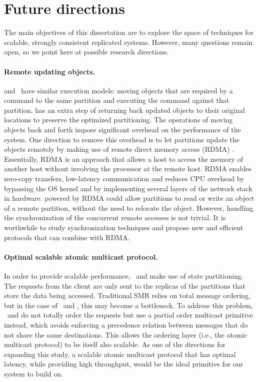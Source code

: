 \section{Future directions}

The main objectives of this dissertation are to explore the space of techniques
for scalable, strongly consistent replicated systems. However, many questions
remain open, so we point here at possible research directions.

\paragraph{Remote updating objects.} \dynastar and \dssmr\ have similar execution
models: moving objects that are required by a command to the same partition and
executing the command against that partition. \dynastar has an extra step of
returning back updated objects to their original locations to preserve the
optimized partitioning. The operations of moving objects back and forth impose
significant overhead on the performance of the system. 
One direction to remove this overhead is to let partitions update the objects
remotely by making use of remote direct memory access (RDMA)
\cite{recio2007remote,dragojevic2014farm}. Essentially, RDMA is an approach
that allows a host to access the memory of another host without involving the
processor at the remote host. RDMA enables zero-copy transfers, low-latency
communication and reduces CPU overhead by bypassing the OS kernel and by
implementing several layers of the network stack in hardware. \dynastar powered
by RDMA could allow partitions to read or write an object
of a remote partition, without the need to relocate the object. However, 
handling the synchronization of the concurrent remote accesses is not trivial.
It is worthwhile to study synchronization techniques and propose new
and efficient protocols that can combine \dynastar with RDMA.

\paragraph{Optimal scalable atomic multicast protocol.} 
In order to provide scalable performance, \dssmr\ and \dynastar make use of
state partitioning. The requests from the client are only sent to the replicas
of the partitions that store the data being accessed. Traditional SMR relies on
total message ordering, but in the case of \dssmr\ and \dynastar, this may
become a bottleneck. To address this problem, \dssmr\ and \dynastar do not
totally order the requests but use a partial order multicast primitive instead,
which avoids enforcing a precedence relation between messages that do not share
the same destinations. This allows the ordering layer (i.e., the atomic
multicast protocol) to be itself also scalable.  As one of the directions for
expanding this study, a scalable atomic multicast protocol that
has optimal latency, while providing high throughput, would be the ideal
primitive for our system to build on.


